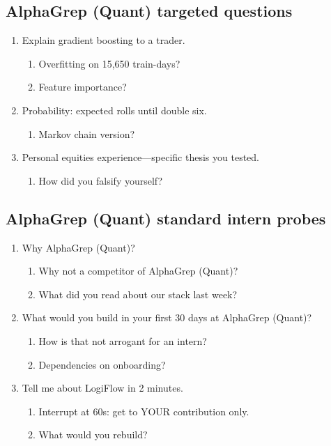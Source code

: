 \documentclass[9pt,a4paper]{article}
\begin{document}
\subsection{AlphaGrep (Quant) targeted questions}
\begin{enumerate}[label=\textbf{Q\arabic*:}, leftmargin=*]
  \item Explain gradient boosting to a trader.
  \begin{enumerate}[label=\textit{FU\arabic*:}, leftmargin=2em]
    \item Overfitting on 15,650 train-days?
    \item Feature importance?
  \end{enumerate}
  \item Probability: expected rolls until double six.
  \begin{enumerate}[label=\textit{FU\arabic*:}, leftmargin=2em]
    \item Markov chain version?
  \end{enumerate}
  \item Personal equities experience---specific thesis you tested.
  \begin{enumerate}[label=\textit{FU\arabic*:}, leftmargin=2em]
    \item How did you falsify yourself?
  \end{enumerate}
\end{enumerate}
\subsection{AlphaGrep (Quant) standard intern probes}
\begin{enumerate}[label=\textbf{Q\arabic*:}, leftmargin=*]
  \item Why AlphaGrep (Quant)?
  \begin{enumerate}[label=\textit{FU\arabic*:}, leftmargin=2em]
    \item Why not a competitor of AlphaGrep (Quant)?
    \item What did you read about our stack last week?
  \end{enumerate}
  \item What would you build in your first 30 days at AlphaGrep (Quant)?
  \begin{enumerate}[label=\textit{FU\arabic*:}, leftmargin=2em]
    \item How is that not arrogant for an intern?
    \item Dependencies on onboarding?
  \end{enumerate}
  \item Tell me about LogiFlow in 2 minutes.
  \begin{enumerate}[label=\textit{FU\arabic*:}, leftmargin=2em]
    \item Interrupt at 60s: get to YOUR contribution only.
    \item What would you rebuild?
  \end{enumerate}
\end{enumerate}
\newpage
\end{document}
